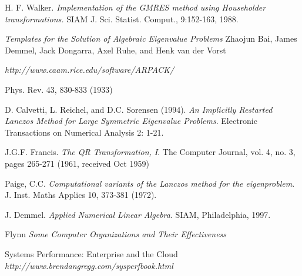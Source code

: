 \documentclass[a4paper,openright,12pt, oneside]{book}
\begin{document}
\begin{thebibliography}{X}
    H. F. Walker. 
    \emph{Implementation of the GMRES method using Householder transformations.}
    SIAM J. Sci. Statist. Comput., 9:152-163, 1988.

    \emph{Templates for the Solution of Algebraic Eigenvalue Problems}
    Zhaojun Bai, James Demmel, Jack Dongarra, Axel Ruhe, and Henk van der Vorst

    \emph{http://www.caam.rice.edu/software/ARPACK/}

    Phys. Rev. 43, 830-833 (1933)

    D. Calvetti, L. Reichel, and D.C. Sorensen (1994). 
    \emph{An Implicitly Restarted Lanczos Method for Large Symmetric Eigenvalue Problems}. 
    Electronic Transactions on Numerical Analysis 2: 1-21.

    J.G.F. Francis.
    \emph {The QR Transformation, I}.
    The Computer Journal, vol. 4, no. 3, pages 265-271 (1961, received Oct 1959) 

    Paige, C.C. 
    \emph{Computational variants of the Lanczos method for the eigenproblem}.
    J. Inst. Maths Applics 10, 373-381 (1972).

    J. Demmel. 
    \emph{Applied Numerical Linear Algebra}.
    SIAM, Philadelphia, 1997.

  Flynn
  \emph{Some Computer Organizations and Their Effectiveness}

  Systems Performance: Enterprise and the Cloud
  \emph{http://www.brendangregg.com/sysperfbook.html}

\end{thebibliography}

%
%

\end{document}
